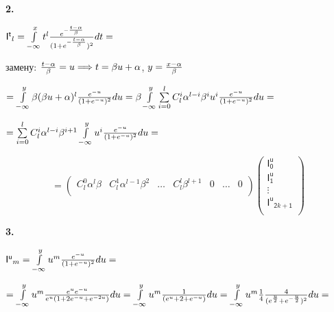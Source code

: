\documentclass[a4paper,12pt]{article}
\begin{document}
\noindent\textbf{2.}

\begin{center}
    $\mathsf{I^t}_l = \int\limits_{-\infty}^x t^l {e^{-{t - \alpha\over{\beta}}}\over{(1 + e^{-{t - \alpha\over{\beta}}}})^2} d t = $
\end{center}

 замену: ${t - \alpha\over{\beta}} = u \Longrightarrow t = \beta u + \alpha$, $y = {x - \alpha\over{\beta}}$

\begin{center}
    $= \int\limits_{-\infty}^y \beta (\beta u + \alpha)^l {e^{-u}\over{(1 + e^{-u}})^2} d u = \beta \int\limits_{-\infty}^y \sum\limits_{i = 0}^l C_l^i \alpha^{l - i} \beta^i u^i {e^{-u}\over{(1 + e^{-u}})^2} d u = $
\end{center}

\begin{center}
    $= \sum\limits_{i = 0}^l C_l^i \alpha^{l - i} \beta^{i + 1}  \int\limits_{-\infty}^y u^i {e^{-u}\over{(1 + e^{-u}})^2} d u =$
\end{center}

\begin{displaymath}
    = \begin{pmatrix}
        C_l^0 \alpha^l \beta & C_l^1 \alpha^{l - 1} \beta^2 & \ldots & C_l^l \beta^{l + 1} & 0 & \ldots & 0 \\
    \end{pmatrix} \begin{pmatrix}
        \mathsf{I^u_0} \\ \mathsf{I^u_1} \\ \vdots \\ \mathsf{I^u}_{\mathsf{2}k + \mathsf{1}} \\
    \end{pmatrix}
\end{displaymath}

\noindent\textbf{3.}

\begin{center}
    $\mathsf{I^u}_m = \int\limits_{-\infty}^y u^m {e^{-u}\over{(1 + e^{-u}})^2} d u =$
\end{center}

\begin{center}
    $= \int\limits_{-\infty}^y u^m {e^{u}e^{-u}\over{e^{u}(1 + 2e^{-u}} + e^{-2u})} d u = \int\limits_{-\infty}^y u^m {1\over{(e^{u} + 2 + e^{-u})}} d u = \int\limits_{-\infty}^y u^m {1\over{4}} {4\over{(e^{u\over{2}} + e^{-{u\over{2}}})^2}} d u =$
\end{center}
\end{document}

